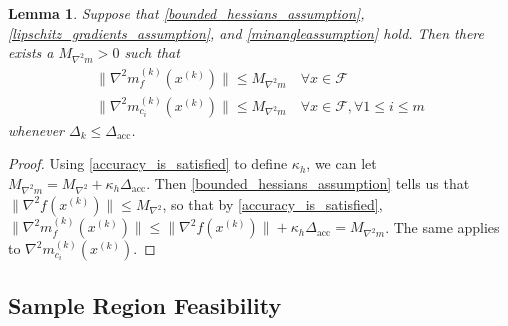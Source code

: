 \documentclass{article}
\newtheorem{lemma}[theorem]{Lemma}
\theoremstyle{case}
\numberwithin{theorem}{subsection}
\newcommand{\dacc}{{\Delta_{\textrm{acc}}}}
\newcommand{\dk}{\Delta_k}
\newcommand{\feasible}{{\mathcal F}}
\newcommand{\hk}{{\nabla^2m_f^{(k)}(x^{(k)})}}
\newcommand{\maxhessian}{{M_{\nabla^2}}}
\newcommand{\maxmodelhessian}{{M_{\nabla^2 m}}}
\newcommand{\xk}{{x^{(k)}}}
\begin{document}
\begin{lemma}
\label{bounded_model_hessian_lemma}
Suppose that \cref{bounded_hessians_assumption}, \cref{lipschitz_gradients_assumption}, and \cref{minangleassumption} hold.
Then there exists a $\maxmodelhessian > 0$ such that 
\begin{align*}
\| \hk \| \le \maxmodelhessian \quad \forall x \in \feasible \\
\|\nabla^2 m_{c_i}^{(k)}(\xk) \| \le \maxmodelhessian \quad \forall x \in \feasible, \forall 1 \le i \le m
\end{align*}
whenever $\dk \le \dacc$.
\end{lemma}

\begin{proof}
Using \cref{accuracy_is_satisfied} to define $\kappa_h$, we can let $\maxmodelhessian = \maxhessian + \kappa_h \dacc$.
Then \cref{bounded_hessians_assumption} tells us that
$\|\nabla^2 f(\xk)\| \le \maxhessian$, so that by \cref{accuracy_is_satisfied},
$\|\hk\| \le \|\nabla^2 f(\xk)\| + \kappa_h\dacc = \maxmodelhessian$.
The same applies to $\nabla^2 m_{c_i}^{(k)}(\xk)$.
\end{proof}

\subsection{Sample Region Feasibility}
\label{ellipsoid_is_feasible_section}
\end{document}
